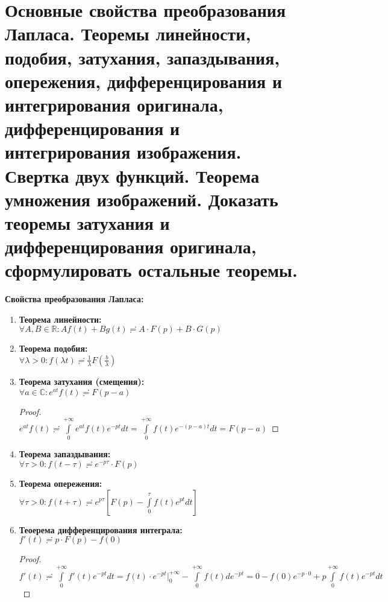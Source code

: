 \newpage
\section{Основные свойства преобразования Лапласа. Теоремы линейности, подобия, затухания, запаздывания, опережения, дифференцирования и интегрирования оригинала, дифференцирования и интегрирования изображения. Свертка двух функций. Теорема умножения изображений. Доказать теоремы затухания и дифференцирования оригинала, сформулировать остальные теоремы.}

\textbf{Свойства преобразования Лапласа:}

\begin{enumerate}
    \item \textbf{Теорема линейности:}\\
    $\forall A, B \in \mathbb{R}: Af(t)+Bg(t)\risingdotseq A\cdot F(p)+B\cdot G(p)$
    \item \textbf{Теорема подобия:}\\
    $\forall \lambda > 0: f(\lambda t) \risingdotseq \frac{1}{\lambda} F\left(\frac{b}{\lambda}\right)$
    \item \textbf{Теорема затухания (смещения):}\\
    $\forall a \in \mathbb{C}: e^{at}f(t)\risingdotseq F(p-a)$\\
    \begin{proof}
        \ \\
        $e^{at}f(t)\risingdotseq \int\limits_0^{+\infty} e^{at}f(t)e^{-pt}dt=\int\limits_0^{+\infty}f(t)e^{-(p-a)t}dt=F(p-a)$
    \end{proof}
    \item \textbf{Теорема запаздывания:}\\
    $\forall \tau > 0: f(t-\tau) \risingdotseq e^{-p\tau}\cdot F(p)$
    \item \textbf{Теорема опережения:}\\
    $\forall \tau > 0: f(t+\tau) \risingdotseq e^{p\tau}[F(p)-\int\limits_0^{\tau}f(t)e^{pt}dt]$
    \item \textbf{Теоерема дифференцирования интеграла:}\\
    $f'(t)\risingdotseq p\cdot F(p) -f(0)$
    \begin{proof}
        \ \\
        $f'(t)\risingdotseq \int\limits_0^{+\infty}f'(t)e^{-pt}dt = f(t)\cdot e^{-pt}|_0^{+\infty} -\int\limits_0^{+\infty} f(t) de^{-pt} = 0 -f(0)e^{-p\cdot 0}+p\int\limits_0^{+\infty}f(t)e^{-pt}dt$\\

\end{proof}
\end{enumerate}
